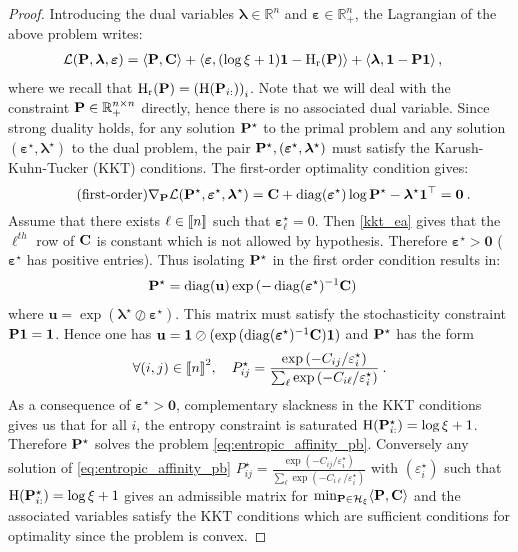 \begin{proof}
Introducing the dual variables $\bm{\lambda} \in \mathbb{R}^n$ and $\bm{\varepsilon} \in \mathbb{R}_+^n$, the Lagrangian of the above problem writes:
\begin{align}
    \mathcal{L}({\mathbf{P}}, \bm{\lambda}, \bm{\varepsilon}) &= \langle {\mathbf{P}}, {\mathbf{C}} \rangle + \langle \bm{\varepsilon}, (\log{\xi}+1) \bm{1} - \operatorname{H}_{\mathrm{r}}({\mathbf{P}}) \rangle + \langle \bm{\lambda}, \bm{1} - {\mathbf{P}} \bm{1} \rangle\,,
\end{align}
where we recall that $\operatorname{H}_{\mathrm{r}}({\mathbf{P}}) = \left( \operatorname{H}({\mathbf{P}}_{i:}) \right)_{i}$. Note that we will deal with the constraint ${\mathbf{P}} \in \mathbb{R}_+^{n \times n}$ directly, hence there is no associated dual variable. Since strong duality holds, for any solution ${\mathbf{P}}^\star$ to the primal problem and any solution $(\bm{\varepsilon}^\star, \bm{\lambda}^\star)$ to the dual problem, the pair ${\mathbf{P}}^\star, (\bm{\varepsilon}^\star, \bm{\lambda}^\star)$ must satisfy the Karush-Kuhn-Tucker (KKT) conditions. The first-order optimality condition gives:
\begin{equation}
\label{kkt_ea}
\tag{first-order}
    \nabla_{{\mathbf{P}}} \mathcal{L}({\mathbf{P}}^\star, \bm{\varepsilon}^\star, \bm{\lambda}^\star) = {\mathbf{C}} + \operatorname{diag}(\bm{\varepsilon}^\star)\log{{\mathbf{P}}^\star} - \bm{\lambda}^\star \bm{1}^\top = \bm{0} \:.
\end{equation}
Assume that there exists $\ell \in {[\![n]\!]}$ such that $\bm{\varepsilon}_\ell^\star = 0$. Then \eqref{kkt_ea} gives that the $\ell^{th}$ row of ${\mathbf{C}}$ is constant which is not allowed by hypothesis. Therefore $\bm{\varepsilon}^\star>\bm{0}$ (\ie $\bm{\varepsilon}^\star$ has positive entries). 
Thus isolating ${\mathbf{P}}^\star$ in the first order condition results in:
\begin{align}
    {\mathbf{P}}^\star &= \operatorname{diag}(\mathbf{u}) \exp{(-\operatorname{diag}(\bm{\varepsilon}^\star)^{-1}{\mathbf{C}})}
\end{align}
where $\mathbf{u} = \exp{(\bm{\lambda}^\star \oslash \bm{\varepsilon}^\star)}$.
This matrix must satisfy the stochasticity constraint ${\mathbf{P}} \bm{1}=\bm{1}$. Hence one has $\mathbf{u} = \bm{1} \oslash (\exp{(\operatorname{diag}(\bm{\varepsilon}^\star)^{-1}{\mathbf{C}})} \bm{1})$ and ${\mathbf{P}}^\star$ has the form
\begin{align}
    \forall (i,j) \in {[\![n]\!]}^2, \quad P^{\star}_{ij} = \frac{\exp{(-C_{ij}/\varepsilon^\star_i)}}{\sum_\ell \exp{(-C_{i\ell}/\varepsilon^\star_i)}} \:.
\end{align}
As a consequence of $\bm{\varepsilon}^\star \bm{>} \bm{0}$, complementary slackness in the KKT conditions gives us that for all $i$, the entropy constraint is saturated \ie $\operatorname{H}({\mathbf{P}}^\star_{i:}) = \log{\xi} + 1$. Therefore ${\mathbf{P}}^\star$ solves the problem \eqref{eq:entropic_affinity_pb}. Conversely any solution of \eqref{eq:entropic_affinity_pb} $P^{\star}_{ij} = \frac{\exp{(-C_{ij}/\varepsilon^\star_i)}}{\sum_\ell \exp{(-C_{i\ell}/\varepsilon^\star_i)}}$ with $(\varepsilon^\star_i)$ such that $\operatorname{H}({\mathbf{P}}^\star_{i:}) = \log{\xi} + 1$  gives an admissible matrix for $\min_{{\mathbf{P}} \in \mathcal{H}_\xi} \langle {\mathbf{P}}, {\mathbf{C}} \rangle$ and the associated variables satisfy the KKT conditions which are sufficient conditions for optimality since the problem is convex.

\end{proof}
